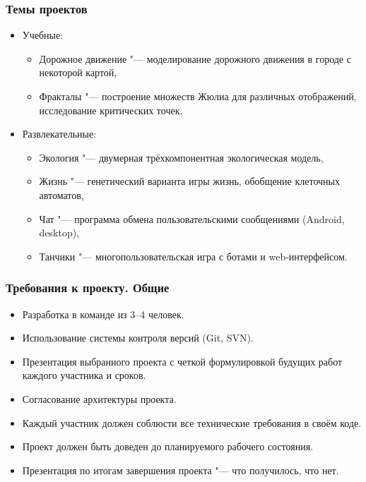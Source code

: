 \documentclass[default]{beamer}
\begin{document}
	\begin{frame}
		\frametitle{Темы проектов}
		
		\begin{itemize}
			\item Учебные:
			\begin{itemize}
				\item Дорожное движение "--- моделирование дорожного движения в городе с некоторой картой,
				\item Фракталы "--- построение множеств Жюлиа для различных отображений, исследование критических точек,
			\end{itemize}
			\item Развлекательные:
			\begin{itemize}
				\item Экология "--- двумерная трёхкомпонентная экологическая модель,
				\item Жизнь "--- генетический варианта игры жизнь, обобщение клеточных автоматов,
				\item Чат "--- программа обмена пользовательскими сообщениями (Android, desktop),
				\item Танчики "--- многопользовательская игра с ботами и web-интерфейсом.
			\end{itemize}
		\end{itemize}
	\end{frame}					

	\begin{frame}
		\frametitle{Требования к проекту. Общие}
		
		\begin{itemize}
			\item Разработка в команде из 3--4 человек.
			\item Использование системы контроля версий (Git, SVN).
			\item Презентация выбранного проекта с четкой формулировкой будущих работ каждого участника и сроков.
			\item Согласование архитектуры проекта.
			\item Каждый участник должен соблюсти все технические требования в своём коде.
			\item Проект должен быть доведен до планируемого рабочего состояния.
			\item Презентация по итогам завершения проекта "--- что получилось, что нет.
		\end{itemize}
	\end{frame}
\end{document}
